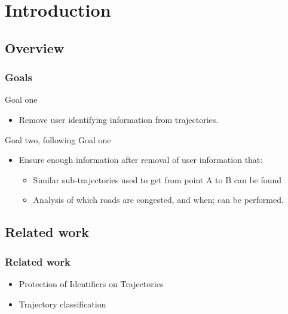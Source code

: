 \section{Introduction} %

\subsection{Overview} %

\begin{frame}[red] %
\frametitle{Goals}

Goal one
\begin{itemize}
\item Remove user identifying information from trajectories.
\end{itemize}

\vspace{3em}
Goal two, following Goal one\\

\begin{itemize}
\item Ensure enough information after removal of user information that:
	\begin{itemize}
	\item Similar sub-trajectories used to get from point A to B can be found
	\item Analysis of which roads are congested, and when; can be performed.
	\end{itemize} 
\end{itemize}
\end{frame}

\subsection{Related work}

\begin{frame}
\frametitle{Related work}

  \begin{itemize}
\item Protection of Identifiers on Trajectories

\item Trajectory classification
\end{itemize}

\end{frame}



